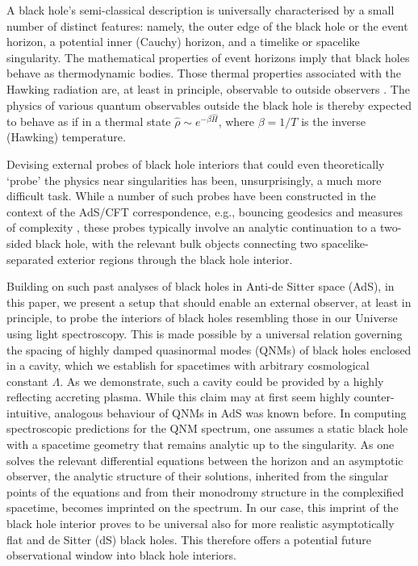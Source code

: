 \documentclass[prd,aps,twocolumn,amsfonts,showpacs,superscriptaddress,preprintnumbers,nofootinbib]{revtex4-2}
\begin{document}
A black hole's semi-classical description is universally characterised by a small number of distinct features: namely, the outer edge of the black hole or the event horizon, a potential inner (Cauchy) horizon, and a timelike or spacelike singularity. The mathematical properties of event horizons imply that black holes behave as thermodynamic bodies. Those thermal properties associated with the Hawking radiation are, at least in principle, observable to outside observers \cite{Hawking:1975vcx}. The physics of various quantum observables outside the black hole is thereby expected to behave as if in a thermal state $\hat\rho \sim e^{-\beta \hat H}$, where $\beta = 1/T$ is the inverse (Hawking) temperature. 

Devising external probes of black hole interiors that could even theoretically `probe' the physics near singularities has been, unsurprisingly, a much more difficult task. While a number of such probes have been constructed in the context of the AdS/CFT correspondence, e.g., bouncing geodesics \cite{Fidkowski:2003nf,Festuccia:2005pi,Ceplak:2024bja} and measures of complexity \cite{Stanford:2014jda,Brown:2015bva}, these probes typically involve an analytic continuation to a two-sided black hole, with the relevant bulk objects connecting two spacelike-separated exterior regions through the black hole interior.

Building on such past analyses of black holes in Anti-de Sitter space (AdS), in this paper, we present a setup that should enable an external observer, at least in principle, to probe the interiors of black holes resembling those in our Universe using light spectroscopy. This is made possible by a universal relation governing the spacing of highly damped quasinormal modes (QNMs) of black holes enclosed in a cavity, which we establish for spacetimes with arbitrary cosmological constant $\Lambda$. As we demonstrate, such a cavity could be provided by a highly reflecting accreting plasma. While this claim may at first seem highly counter-intuitive, analogous behaviour of QNMs in AdS was known before. In computing spectroscopic predictions for the QNM spectrum, one assumes a static black hole with a spacetime geometry that remains analytic up to the singularity. As one solves the relevant differential equations between the horizon and an asymptotic observer, the analytic structure of their solutions, inherited from the singular points of the equations and from their monodromy structure in the complexified spacetime, becomes imprinted on the spectrum. In our case, this imprint of the black hole interior proves to be universal also for more realistic asymptotically flat and de Sitter (dS) black holes. This therefore offers a potential future observational window into black hole interiors.
\end{document}
